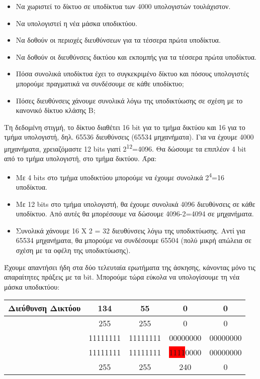 \begin{itemize}
\item Να χωριστεί το δίκτυο σε υποδίκτυα των 4000 υπολογιστών τουλάχιστον.
\item Να υπολογιστεί η νέα μάσκα υποδικτύου.
\item Να δοθούν οι περιοχές διευθύνσεων για τα τέσσερα πρώτα υποδίκτυα.
\item Να δοθούν οι διευθύνσεις δικτύου και εκπομπής για τα τέσσερα πρώτα υποδίκτυα.
\item Πόσα συνολικά υποδίκτυα έχει το συγκεκριμένο δίκτυο και πόσους υπολογιστές μπορούμε πραγματικά να συνδέσουμε σε κάθε υποδίκτυο;
\item Πόσες διευθύνσεις χάνουμε συνολικά λόγω της υποδικτύωσης σε σχέση με το κανονικό δίκτυο κλάσης B;  
\end{itemize}

Τη δεδομένη στιγμή, το δίκτυο διαθέτει 16 bit για το τμήμα δικτύου και 16 για το τμήμα υπολογιστή, δηλ. 65536 διευθύνσεις (65534 μηχανήματα). Για να έχουμε 4000 μηχανήματα, χρειαζόμαστε 12 bits γιατί 2\textsuperscript{12}=4096. Θα δώσουμε τα επιπλέον 4 bit από το τμήμα υπολογιστή, στο τμήμα δικτύου. Άρα:

\begin{itemize}
\item Με 4 bits στο τμήμα υποδικτύου μπορούμε να έχουμε συνολικά 2\textsuperscript{4}=16 υποδίκτυα.
\item Με 12 bits στο τμήμα υπολογιστή, θα έχουμε συνολικά 4096 διευθύνσεις σε κάθε υποδίκτυο. Από αυτές θα μπορέσουμε να δώσουμε 4096-2=4094 σε μηχανήματα.
\item Συνολικά χάνουμε 16 Χ 2 = 32 διευθύνσεις λόγω της υποδικτύωσης. Αντί για 65534 μηχανήματα, θα μπορούμε να συνδέσουμε 65504 (πολύ μικρή απώλεια σε σχέση με τα οφέλη της υποδικτύωσης).
\end{itemize}

Έχουμε απαντήσει ήδη στα δύο τελευταία ερωτήματα της άσκησης, κάνοντας μόνο τις απαραίτητες πράξεις με τα bit. Μπορούμε τώρα εύκολα να υπολογίσουμε τη νέα μάσκα υποδικτύου:

\begin{center}
\fontsize{11}{13}
\ttfamily
\begin{tabular}{|c|c|c|c|c|}
\hline
 \textbf{Διεύθυνση Δικτύου} & 134 & 55 & 0 & 0 \\ 
\hline
\multirow{2}{*}{} \textbf{Παλιά Μάσκα} & 255 & 255 & 0  & 0 \\ 
\cline{2-5} 
              \textbf{Δικτύου} & 11111111  & 11111111 & 00000000 & 00000000 \\ 
\hline
\multirow{2}{*}{} \textbf{Νέα Μάσκα} & 11111111 & 11111111 & \colorbox{red}{1111}0000 & 00000000  \\ 
\cline{2-5} 
             \textbf{Υποδικτύου} & 255 & 255 & 240 & 0 \\ 
\hline
\end{tabular}
\normalfont
\end{center}

